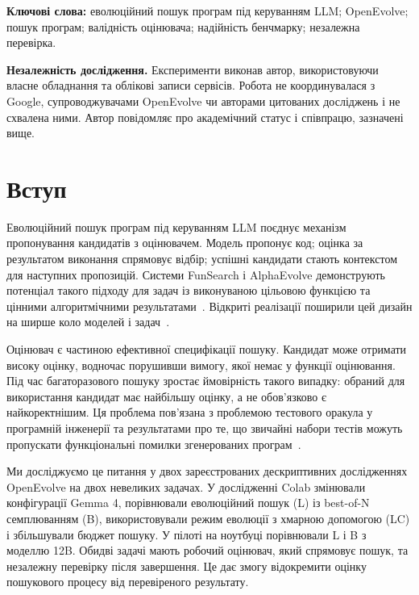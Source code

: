 \documentclass[11pt]{article}
\begin{document}
\noindent\textbf{Ключові слова:} еволюційний пошук програм під керуванням LLM; OpenEvolve; пошук програм; валідність оцінювача; надійність бенчмарку; незалежна перевірка.

\medskip
\noindent\textbf{Незалежність дослідження.} Експерименти виконав автор, використовуючи власне обладнання та облікові записи сервісів. Робота не координувалася з Google, супроводжувачами OpenEvolve чи авторами цитованих досліджень і не схвалена ними. Автор повідомляє про академічний статус і співпрацю, зазначені вище.

\section{Вступ}\label{sec:intro}

Еволюційний пошук програм під керуванням LLM поєднує механізм пропонування кандидатів з оцінювачем. Модель пропонує код; оцінка за результатом виконання спрямовує відбір; успішні кандидати стають контекстом для наступних пропозицій. Системи FunSearch і AlphaEvolve демонструють потенціал такого підходу для задач із виконуваною цільовою функцією та цінними алгоритмічними результатами~\citep{romera2024funsearch,novikov2025alphaevolve}. Відкриті реалізації поширили цей дизайн на ширше коло моделей і задач~\citep{assumpcao2025codeevolve,sharma2026openevolve}.

Оцінювач є частиною ефективної специфікації пошуку. Кандидат може отримати високу оцінку, водночас порушивши вимогу, якої немає у функції оцінювання. Під час багаторазового пошуку зростає ймовірність такого випадку: обраний для використання кандидат має найбільшу оцінку, а не обов'язково є найкоректнішим. Ця проблема пов'язана з проблемою тестового оракула у програмній інженерії та результатами про те, що звичайні набори тестів можуть пропускати функціональні помилки згенерованих програм~\citep{barr2015oracle,liu2023evalplus}.

Ми досліджуємо це питання у двох зареєстрованих дескриптивних дослідженнях OpenEvolve на двох невеликих задачах. У дослідженні Colab змінювали конфігурації Gemma 4, порівнювали еволюційний пошук (L) із best-of-N семплюванням (B), використовували режим еволюції з хмарною допомогою (LC) і збільшували бюджет пошуку. У пілоті на ноутбуці порівнювали L і B з моделлю 12B. Обидві задачі мають робочий оцінювач, який спрямовує пошук, та незалежну перевірку після завершення. Це дає змогу відокремити оцінку пошукового процесу від перевіреного результату.
\end{document}
